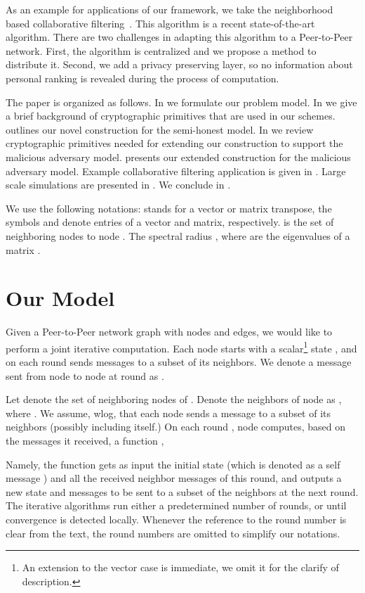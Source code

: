 \documentclass[10pt]{svjour3}
\begin{document}
As an example for applications of our framework, we take the
neighborhood based collaborative filtering~\cite{KorenCF}. This
algorithm is a recent state-of-the-art algorithm. There are two
challenges in adapting this algorithm to a Peer-to-Peer network.
First, the algorithm is centralized and we propose a method to
distribute it. Second, we add a privacy preserving layer, so no
information about personal ranking is revealed during the process
of computation.

The paper is organized as follows. In  we
formulate our problem model. In  we give a
brief background of cryptographic primitives that are used in our
schemes.  outlines our novel construction for
the semi-honest model. In  we review
cryptographic primitives needed for extending our construction to
support the malicious adversary model.
 presents our extended construction for the
malicious adversary model. Example collaborative filtering
application is given in . Large scale
simulations are presented in . We conclude in
.

We use the following notations:  stands for a vector or matrix
transpose, the symbols  and  denote
entries of a vector and matrix, respectively.  is the set of neighboring nodes to node . The spectral radius
, where
 are the eigenvalues of a matrix
.

\section{Our Model}
\label{model} Given a Peer-to-Peer network graph  with
 nodes and  edges, we would like to perform a
joint iterative computation. Each node  starts with a
scalar\footnote{An extension to the vector case is immediate, we
omit it for the clarify of description.} state , and on each round sends messages to a subset of its
neighbors. We denote a message sent from node  to node  at
round  as .

Let  denote the set of neighboring nodes of .  Denote the
neighbors of node  as , where
.  We assume, wlog, that each node sends a message to a
subset of its neighbors (possibly including itself.)  On each round , node 
computes, based on the messages it received, a function ,
\small

\normalsize

Namely, the function gets as input the initial state (which is
denoted as a self message ) and all the received neighbor
messages of this round, and outputs a new state and messages to be
sent to a subset of the neighbors at the next round. The iterative
algorithms run either a predetermined number of rounds, or until
convergence is detected locally. Whenever the reference to the
round number is clear from the text, the round numbers are omitted
to simplify our notations.
\end{document}
